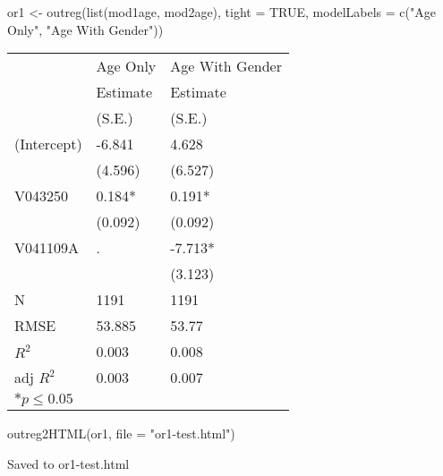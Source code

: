 \begin{Schunk}
\begin{Sinput}
 or1 <- outreg(list(mod1age, mod2age), tight = TRUE, modelLabels = c("Age Only", "Age With Gender"))
\end{Sinput}
\begin{Soutput}
\begin{tabular}{*{3}{l}}
 \hline
                & Age Only & Age With Gender   \\
                &Estimate &Estimate\\
                &(S.E.)  &(S.E.) \\
 \hline
 \hline
  (Intercept)    & -6.841 &  4.628 \\
               &(4.596)  &(6.527)  \\
  V043250        &  0.184* &  0.191* \\
               &(0.092)  &(0.092)  \\
  V041109A        & .      & -7.713* \\
               &        &(3.123)  \\
 \hline 
 N                &1191      &1191       \\
 RMSE            &53.885  &53.77   \\
 $R^2$           &0.003  &0.008   \\
 adj $R^2$       &0.003  &0.007   \\
 \hline
 \hline
 
 \multicolumn{2}{l}{${*}  p \le 0.05$   }\\
 \end{tabular}
\end{Soutput}
\begin{Sinput}
 outreg2HTML(or1, file = "or1-test.html")
\end{Sinput}
\begin{Soutput}
Saved to  or1-test.html 
\end{Soutput}
\end{Schunk}
